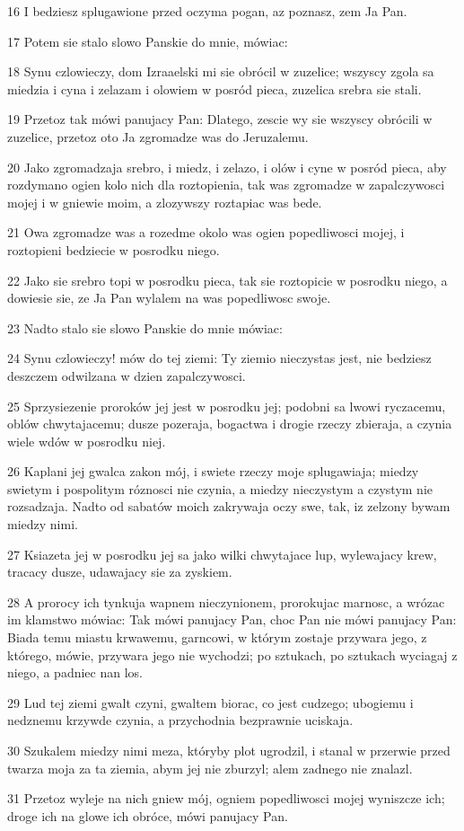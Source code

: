 \par 16 I bedziesz splugawione przed oczyma pogan, az poznasz, zem Ja Pan.
\par 17 Potem sie stalo slowo Panskie do mnie, mówiac:
\par 18 Synu czlowieczy, dom Izraaelski mi sie obrócil w zuzelice; wszyscy zgola sa miedzia i cyna i zelazam i olowiem w posród pieca, zuzelica srebra sie stali.
\par 19 Przetoz tak mówi panujacy Pan: Dlatego, zescie wy sie wszyscy obrócili w zuzelice, przetoz oto Ja zgromadze was do Jeruzalemu.
\par 20 Jako zgromadzaja srebro, i miedz, i zelazo, i olów i cyne w posród pieca, aby rozdymano ogien kolo nich dla roztopienia, tak was zgromadze w zapalczywosci mojej i w gniewie moim, a zlozywszy roztapiac was bede.
\par 21 Owa zgromadze was a rozedme okolo was ogien popedliwosci mojej, i roztopieni bedziecie w posrodku niego.
\par 22 Jako sie srebro topi w posrodku pieca, tak sie roztopicie w posrodku niego, a dowiesie sie, ze Ja Pan wylalem na was popedliwosc swoje.
\par 23 Nadto stalo sie slowo Panskie do mnie mówiac:
\par 24 Synu czlowieczy! mów do tej ziemi: Ty ziemio nieczystas jest, nie bedziesz deszczem odwilzana w dzien zapalczywosci.
\par 25 Sprzysiezenie proroków jej jest w posrodku jej; podobni sa lwowi ryczacemu, oblów chwytajacemu; dusze pozeraja, bogactwa i drogie rzeczy zbieraja, a czynia wiele wdów w posrodku niej.
\par 26 Kaplani jej gwalca zakon mój, i swiete rzeczy moje splugawiaja; miedzy swietym i pospolitym róznosci nie czynia, a miedzy nieczystym a czystym nie rozsadzaja. Nadto od sabatów moich zakrywaja oczy swe, tak, iz zelzony bywam miedzy nimi.
\par 27 Ksiazeta jej w posrodku jej sa jako wilki chwytajace lup, wylewajacy krew, tracacy dusze, udawajacy sie za zyskiem.
\par 28 A prorocy ich tynkuja wapnem nieczynionem, prorokujac marnosc, a wrózac im klamstwo mówiac: Tak mówi panujacy Pan, choc Pan nie mówi panujacy Pan: Biada temu miastu krwawemu, garncowi, w którym zostaje przywara jego, z którego, mówie, przywara jego nie wychodzi; po sztukach, po sztukach wyciagaj z niego, a padniec nan los.
\par 29 Lud tej ziemi gwalt czyni, gwaltem biorac, co jest cudzego; ubogiemu i nedznemu krzywde czynia, a przychodnia bezprawnie uciskaja.
\par 30 Szukalem miedzy nimi meza, któryby plot ugrodzil, i stanal w przerwie przed twarza moja za ta ziemia, abym jej nie zburzyl; alem zadnego nie znalazl.
\par 31 Przetoz wyleje na nich gniew mój, ogniem popedliwosci mojej wyniszcze ich; droge ich na glowe ich obróce, mówi panujacy Pan.

